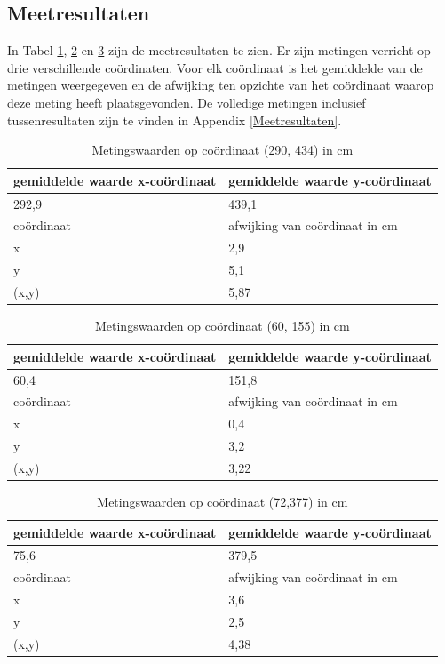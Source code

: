 \documentclass{article}
\begin{document}
\subsection{Meetresultaten}
\label{gemiddeldes}
In Tabel \ref{table:res1}, \ref{table:res2} en \ref{table:res3} zijn de meetresultaten te zien. Er zijn  metingen verricht op drie verschillende co\"ordinaten. Voor elk co\"ordinaat is het gemiddelde van de metingen weergegeven en de afwijking ten opzichte van het co\"ordinaat waarop deze meting heeft plaatsgevonden. De volledige metingen inclusief tussenresultaten zijn te vinden in Appendix \ref{Meetresultaten}.

\begin{table}[h!]
\centering
\caption{Metingswaarden op co\"ordinaat (290, 434) in cm}\label{table:res1}
\begin{tabular}{ |l|l| }
  \hline
    gemiddelde waarde x-co\"ordinaat & gemiddelde waarde y-co\"ordinaat \\ \hline
     292,9 & 439,1 \\ \hline  \hline
  co\"ordinaat & afwijking van co\"ordinaat in cm\\ \hline 
  x & 2,9 \\ \hline
  y & 5,1 \\ \hline
  (x,y) & 5,87 \\ \hline
\end{tabular}
\end{table}

\begin{table}[h!]
\centering
\caption{Metingswaarden op co\"ordinaat (60, 155) in cm}\label{table:res2}
\begin{tabular}{ |l|l| }
  \hline
    gemiddelde waarde x-co\"ordinaat & gemiddelde waarde y-co\"ordinaat \\ \hline
     60,4 & 151,8 \\ \hline  \hline
  co\"ordinaat & afwijking van co\"ordinaat in cm\\ \hline 
  x & 0,4 \\ \hline
  y & 3,2 \\ \hline
  (x,y) & 3,22 \\ \hline
\end{tabular}
\end{table}

\begin{table}[h!]
\centering
\caption{Metingswaarden op co\"ordinaat (72,377) in cm}\label{table:res3}
\begin{tabular}{ |l|l| }
  \hline
    gemiddelde waarde x-co\"ordinaat & gemiddelde waarde y-co\"ordinaat \\ \hline
     75,6 & 379,5 \\ \hline  \hline
  co\"ordinaat & afwijking van co\"ordinaat in cm\\ \hline 
  x & 3,6 \\ \hline
  y & 2,5 \\ \hline
  (x,y) & 4,38 \\ \hline
\end{tabular}
\end{table}
\end{document}
